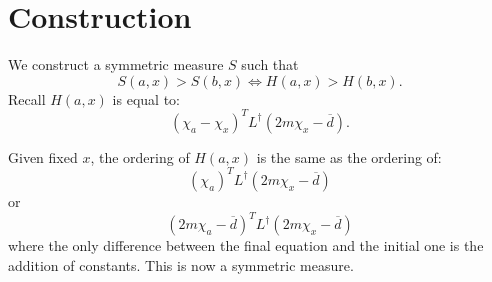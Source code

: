 \section{Construction}
We construct a symmetric measure $S$ such that
\[S(a, x) > S(b, x) \Leftrightarrow H(a,x) > H(b, x). \]
Recall $H(a, x)$ is equal to:
\[ \left(\chi_{a}-\chi_x\right)^T L^\dag (2m \chi_x -
    \overline{d}). \]

Given fixed $x$, the ordering of $H(a,x)$ is the same as the
ordering of:
\[ (\chi_{a})^T L^\dag (2m \chi_x -
    \overline{d}) \]
or
\[ (2m \chi_{a} - \overline{d})^T L^\dag (2m \chi_x -
    \overline{d}) \]
where the only difference between the final equation and the
initial one is the addition of constants. This is now a symmetric
measure.
